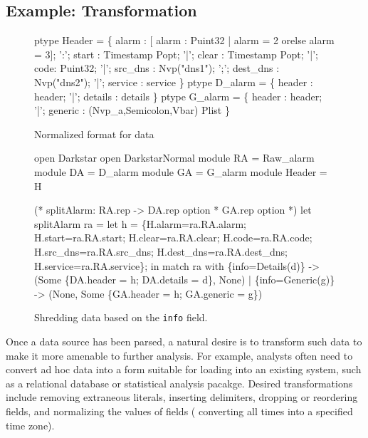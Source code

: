 \subsection{Example: Transformation}
\label{sec:ex-trans}

\begin{figure}
  \centering
  \begin{code}
ptype Header = \{
       alarm : [ alarm : Puint32 | alarm = 2 
                                    orelse alarm = 3];
 ':';  start :  Timestamp Popt;
 '|';  clear :  Timestamp Popt;
 '|';  code: Puint32;
 '|';  src\_dns  :  Nvp("dns1");
 ';';  dest\_dns :  Nvp("dns2");
 '|';  service  : service
\}
\mbox{}
ptype D\_alarm = \{
       header   : header;
 '|';  details  : details
 \}
\mbox{}
ptype G\_alarm = \{
       header   : header;
 '|';  generic  : (Nvp\_a,Semicolon,Vbar) Plist
\}
\end{code}
\caption{Normalized format for \darkstar{} data}
\label{fig:normal-darkstar}
\end{figure}

\begin{figure}
\begin{code}
\mbox{}
open Darkstar
open DarkstarNormal
module RA = Raw\_alarm
module DA = D\_alarm
module GA = G\_alarm
module Header = H

(* splitAlarm: RA.rep -> DA.rep option * GA.rep option *)
let splitAlarm ra =
    let h = \{H.alarm=ra.RA.alarm; H.start=ra.RA.start; 
              H.clear=ra.RA.clear; H.code=ra.RA.code;
              H.src\_dns=ra.RA.src\_dns; H.dest\_dns=ra.RA.dest\_dns;
              H.service=ra.RA.service\};
    in match ra with
        \{info=Details(d)\} -> 
        (Some \{DA.header = h; DA.details = d\}, None)
      | \{info=Generic(g)\} ->
        (None, Some \{GA.header = h; GA.generic = g\})    
  \end{code}
  \caption{Shredding \darkstar{} data based on the {\tt info} field.}
  \label{fig:ex-no-err-check}
\end{figure}

Once a data source has been parsed, a natural desire is to transform
such data to make it more amenable to further analysis.  For example,
analysts often need to convert ad hoc data into a form suitable for
loading into an existing system, such as a relational database or
statistical analysis pacakge.  Desired transformations include
removing extraneous literals, inserting delimiters, dropping or
reordering fields, and normalizing the values of fields (\eg{}
converting all times into a specified time zone).  

